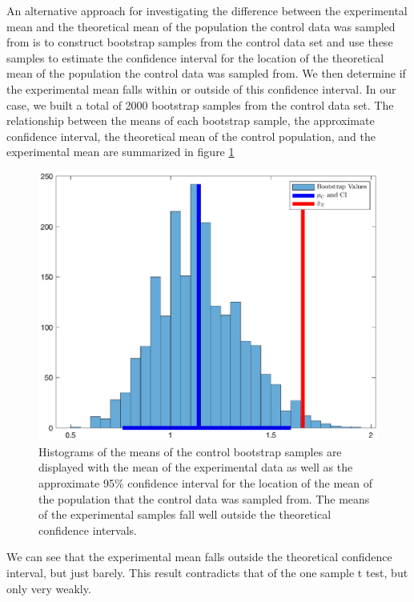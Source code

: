 \documentclass{amsart}
\begin{document}
An alternative approach for investigating the difference between the experimental mean and the theoretical mean of the population the control data was sampled from is to construct bootstrap samples from the control data set and use these samples to estimate the confidence interval for the location of the theoretical mean of the population the control data was sampled from. We then determine if the experimental mean falls within or outside of this confidence interval. In our case, we built a total of 2000 bootstrap samples from the control data set. The relationship between the means of each bootstrap sample, the approximate confidence interval, the theoretical mean of the control population, and the experimental mean are summarized in figure \ref{F:bootstrapOneSample}
\begin{figure}[H]
\centering
\includegraphics[scale=0.55]{bootstrapOneSample}
\caption{
Histograms of the means of the control bootstrap samples are displayed with the mean of the experimental data  as well as the approximate 95\% confidence interval for the location of the mean of the population that the  control data was sampled from. The means of the experimental samples fall well outside the theoretical confidence intervals.\label{F:bootstrapOneSample}}
\end{figure}
We can see that the experimental mean falls outside the theoretical confidence interval, but just barely. This result contradicts that of the one sample t test, but only very weakly.
\end{document}
